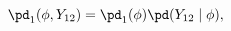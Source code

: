 \begin{equation}
  \pd_{1}(\phi, Y_{12}) =
    \pd_{1}(\phi) 
    \pd(Y_{12} \mid \phi),
  \label{eqn:study-12-submodel}
\end{equation}